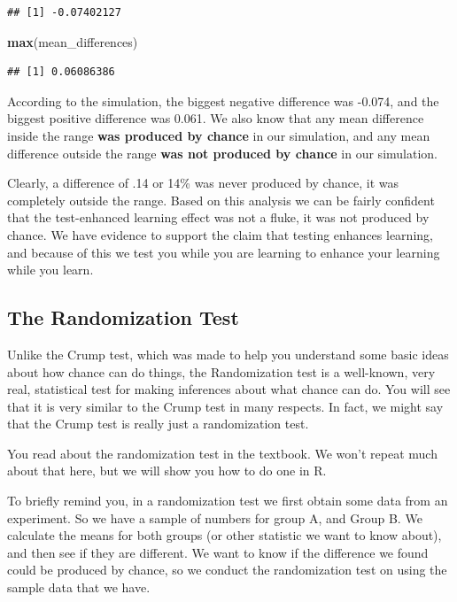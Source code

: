 \documentclass[]{book}
\newenvironment{Shaded}{\begin{snugshade}}{\end{snugshade}}
\newcommand{\KeywordTok}[1]{\textcolor[rgb]{0.13,0.29,0.53}{\textbf{{#1}}}}
\newcommand{\NormalTok}[1]{{#1}}
\theoremstyle{definition}
\theoremstyle{definition}
\theoremstyle{definition}
\theoremstyle{remark}
\begin{document}
\begin{verbatim}
## [1] -0.07402127
\end{verbatim}

\begin{Shaded}
\begin{Highlighting}[]
\KeywordTok{max}\NormalTok{(mean_differences)}
\end{Highlighting}
\end{Shaded}

\begin{verbatim}
## [1] 0.06086386
\end{verbatim}

According to the simulation, the biggest negative difference was -0.074,
and the biggest positive difference was 0.061. We also know that any
mean difference inside the range \textbf{was produced by chance} in our
simulation, and any mean difference outside the range \textbf{was not
produced by chance} in our simulation.

Clearly, a difference of .14 or 14\% was never produced by chance, it
was completely outside the range. Based on this analysis we can be
fairly confident that the test-enhanced learning effect was not a fluke,
it was not produced by chance. We have evidence to support the claim
that testing enhances learning, and because of this we test you while
you are learning to enhance your learning while you learn.

\subsection{The Randomization Test}\label{the-randomization-test}

Unlike the Crump test, which was made to help you understand some basic
ideas about how chance can do things, the Randomization test is a
well-known, very real, statistical test for making inferences about what
chance can do. You will see that it is very similar to the Crump test in
many respects. In fact, we might say that the Crump test is really just
a randomization test.

You read about the randomization test in the textbook. We won't repeat
much about that here, but we will show you how to do one in R.

To briefly remind you, in a randomization test we first obtain some data
from an experiment. So we have a sample of numbers for group A, and
Group B. We calculate the means for both groups (or other statistic we
want to know about), and then see if they are different. We want to know
if the difference we found could be produced by chance, so we conduct
the randomization test on using the sample data that we have.
\end{document}
